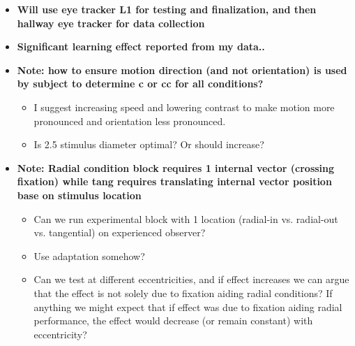 \documentclass[11pt]{article} %
\begin{document}
\begin{itemize}
\begin{itemize}
\begin{itemize}
		\end{itemize}
	\item \textbf{Will use eye tracker L1 for testing and finalization, and then hallway eye tracker for data collection}
	\item \textbf{Significant learning effect reported from my data..}
	\item \textbf{Note: how to ensure motion direction (and not orientation) is used by subject to determine c or cc for all conditions?}
		\begin{itemize}
			\item{I suggest increasing speed and lowering contrast to make motion more pronounced and orientation less pronounced.}
			\item{Is 2.5 stimulus diameter optimal? Or should increase?}
		\end{itemize}
	\item \textbf{Note: Radial condition block requires 1 internal vector (crossing fixation) while tang requires translating internal vector position base on stimulus location}
		\begin{itemize}
			\item{Can we run experimental block with 1 location (radial-in vs. radial-out vs. tangential) on experienced observer?}
			\item{Use adaptation somehow?}
			\item{Can we test at different eccentricities, and if effect increases we can argue that the effect is not solely due to fixation aiding radial conditions? If anything we might expect that if effect was due to fixation aiding radial performance, the effect would decrease (or remain constant) with eccentricity?}
		\end{itemize}
	\end{itemize}
\end{itemize}
\end{document}
